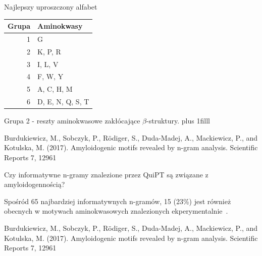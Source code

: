 \documentclass{beamer}\usepackage[]{graphicx}\usepackage[]{color}
\newcommand{\btVFill}{\vskip0pt plus 1filll}
\begin{document}
  
     \begin{frame}{Najlepszy uproszczony alfabet}
   \begin{table}[ht]
\centering
\begin{tabular}{rl}
  \toprule
Grupa & Aminokwasy \\ 
  \midrule
  1 & G \\ 
   \rowcolor{red!20}  2 & K, P, R \\ 
    3 & I, L, V \\ 
   \rowcolor[gray]{0.85}  4 & F, W, Y \\ 
    5 & A, C, H, M \\ 
   \rowcolor[gray]{0.85}  6 & D, E, N, Q, S, T \\ 
   \bottomrule
\end{tabular}
\end{table}
   
Grupa 2 - reszty aminokwasowe zakłócające $\beta$-struktury.  
   \btVFill

\tiny{Burdukiewicz, M., Sobczyk, P., Rödiger, S., Duda-Madej, A., Mackiewicz, P., and Kotulska, M. (2017). Amyloidogenic motifs revealed by n-gram analysis. Scientific Reports 7, 12961}
   \end{frame}  
   

\begin{frame}{}
Czy informatywne n-gramy znalezione przez QuiPT są związane z amyloidogennością?

Spośród 65 najbardziej informatywnych n-gramów, 15 (23\%) jest również obecnych w motywach aminokwasowych znalezionych ekperymentalnie~\citep{paz_sequence_2004}.

\tiny{Burdukiewicz, M., Sobczyk, P., Rödiger, S., Duda-Madej, A., Mackiewicz, P., and Kotulska, M. (2017). Amyloidogenic motifs revealed by n-gram analysis. Scientific Reports 7, 12961}
\end{frame}
\end{document}
